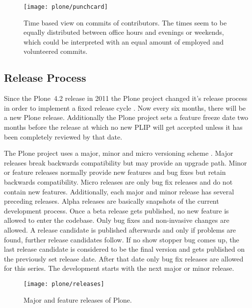 \begin{figure}[bhtp]
  \centering
  \texttt{[image: plone/punchcard]}
  \caption[Time Based View on Commits, Plone]
  {Time based view on commits of contributors. The times seem to be equally
    distributed between office hours and evenings or weekends, which could be
    interpreted with an equal amount of employed and volunteered commits.}
  \label{fig:plone:p}
\end{figure}


\subsection{Release Process} %

Since the Plone~4.2 release in 2011 the Plone project changed it's release
process in order to implement a fixed release cycle
\cite{PloneFixedReleaseCycle}. Now every six months, there will be a new Plone
release. Additionally the Plone project sets a feature freeze date two months
before the release at which no new \ac{PLIP} will get accepted unless it has
been completely reviewed by that date.

The Plone project uses a major, minor and micro versioning scheme
\cite{PloneReleaseProcess,PloneCommunityProcesses}. Major releases break
backwards compatibility but may provide an upgrade path. Minor or feature
releases normally provide new features and bug fixes but retain backwards
compatibility. Micro releases are only bug fix releases and do not contain new
features. Additionally, each major and minor release has several preceding
releases. Alpha releases are basically snapshots of the current development
process. Once a beta release gets published, no new feature is allowed to enter
the codebase. Only bug fixes and non-invasive changes are allowed. A release
candidate is published afterwards and only if problems are found, further
release candidates follow. If no show stopper bug comes up, the last release
candidate is considered to be the final version and gets published on the
previously set release date. After that date only bug fix releases are allowed
for this series. The development starts with the next major or minor release.

\begin{figure}[htbp]
  \centering
  \texttt{[image: plone/releases]}
  \caption[Major Releases of Plone]{Major and feature releases of Plone.}
\end{figure}


